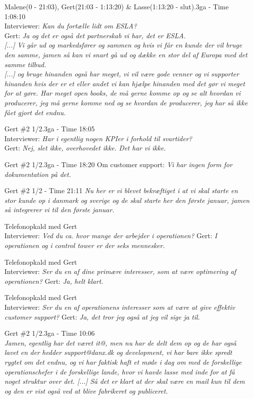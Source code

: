 \begin{thebibliography}{9}
	Malene(0 - 21:03), Gert(21:03 - 1:13:20) \& Lasse(1:13:20 - slut).3ga - Time 1:08:10\\
	Interviewer: \textit{Kan du fortælle lidt om ESLA?}\\
	Gert: \textit{Ja og det er også det partnerskab vi har, det er ESLA.}\\
	\textit{[...] Vi går ud og markedsfører og sammen og hvis vi får en kunde der vil bruge den samme, jamen så kan vi snart gå ud og dække en stor del af Europa med det samme tilbud.}\\
	\textit{[...] og bruge hinanden også har meget, vi vil være gode venner og vi supporter hinanden hvis der er et eller andet vi kan hjælpe hinanden med det gør vi meget for at gøre. Har meget open books, de må gerne komme op og se alt hvordan vi producerer, jeg må gerne komme ned og se hvordan de producerer, jeg har så ikke fået gjort det endnu.}

	Gert \#2 1/2.3ga - Time 18:05\\
	Interviewer: \textit{Har i egentlig nogen KPIer i forhold til svartider?}\\
	Gert: \textit{Nej, slet ikke, overhovedet ikke. Det har vi ikke.}

	Gert \#2 1/2.3ga - Time 18:20
	Om customer support:
	\textit{Vi har ingen form for dokumentation på det.}

	Gert \#2 1/2 - Time 21:11
	\textit{Nu her er vi blevet bekræftiget i at vi skal starte en stor kunde op i danmark og sverige og de skal starte her den første januar, jamen så integrerer vi til den første januar.}

	Telefonopkald med Gert\\
	Interviewer: \textit{Ved du ca. hvor mange der arbejder i operationen?}
	 Gert: \textit{I operationen og i control tower er der seks mennesker.}

	Telefonopkald med Gert\\
	Interviewer: \textit{Ser du en af dine primære interesser, som at være optimering af operationen?} Gert: \textit{Ja, helt klart.}

	Telefonopkald med Gert\\
	Interviewer: \textit{Ser du en af operationens interesser som at være at give effektiv customer support?} Gert: \textit{Ja, det tror jeg også at jeg vil sige ja til.}

	Gert \#2 1/2.3ga - Time 10:06\\
	\textit{Jamen, egentlig har det været it@, men nu har de delt dem op og de har også lavet en der hedder support@danx.dk og development, vi har bare ikke spredt rygtet om det endnu, og vi har faktisk haft et møde i dag om med de forskellige operationschefer i de forskellige lande, hvor vi havde lasse med inde for at få noget struktur over det. [...] Så det er klart at der skal være en mail kun til dem og den er vist også ved at blive fabrikeret og publiceret. }


\end{thebibliography}

